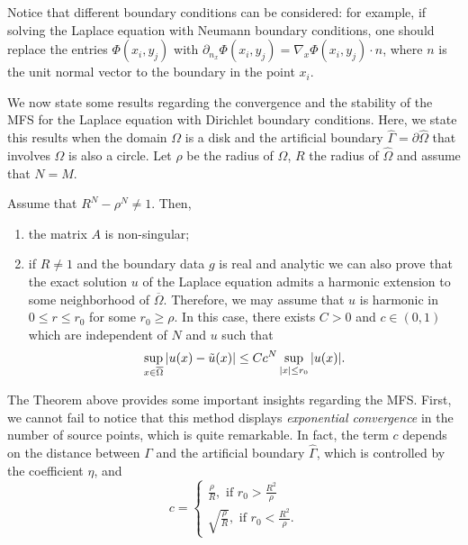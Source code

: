 Notice that different boundary conditions can be considered: for example, if solving the Laplace equation with Neumann boundary conditions, one should replace the entries \(\Phi(x_i,y_j)\) with \(\partial_{n_x}\Phi(x_i,y_j) = \nabla_x\Phi(x_i,y_j)\cdot n\), where \(n\) is the unit normal vector to the boundary in the point \(x_i\).

We now state some results regarding the convergence and the stability of the \ac{MFS} for the Laplace equation with Dirichlet boundary conditions. Here, we state this results when the domain \(\Omega\) is a disk and the artificial boundary \(\hat{\Gamma} = \partial \hat{\Omega}\) that involves \(\Omega\) is also a circle. Let \(\rho\) be the radius of \(\Omega\), \(R\) the radius of \(\hat{\Omega}\) and assume that \(N=M\).
\begin{theorem}\label{MFS_lap_conv}
    Assume that \(R^N - \rho^N \neq 1\). Then,
    \begin{enumerate}
        \item the matrix \(A\) is non-singular;
        \item if \(R \neq 1\) and the boundary data \(g\) is real and analytic we can also prove that the exact solution \(u\) of the Laplace equation admits a harmonic extension to some neighborhood of \(\overline{\Omega}\). Therefore, we may assume that \(u\) is harmonic in \(0 \leq r \leq r_0\) for some \(r_0 \geq \rho\). In this case, there exists \(C > 0\) and \(c \in (0, 1)\) which are independent of \(N\) and \(u\) such that
        \[
            \sup_{\substack{x \in \overline{\Omega}}} \abs{u(x) - \tilde{u}(x)} \leq C c^N \sup_{\substack{\abs{x}\leq r_0}}\abs{u(x)}.
        \]
    \end{enumerate}
\end{theorem}
The Theorem above provides some important insights regarding the \ac{MFS}. First, we cannot fail to notice that this method displays \textit{exponential convergence} in the number of source points, which is quite remarkable. In fact, the term \(c\) depends on the distance between \(\Gamma\) and the artificial boundary \(\hat{\Gamma}\), which is controlled by the coefficient \(\eta\), and
\[
    c = \begin{cases}
        \frac{\rho}{R}, \text{ if } r_0 > \frac{R^2}{\rho}\\
        \sqrt{\frac{\rho}{R}}, \text{ if } r_0 < \frac{R^2}{\rho}.
    \end{cases}
\]
